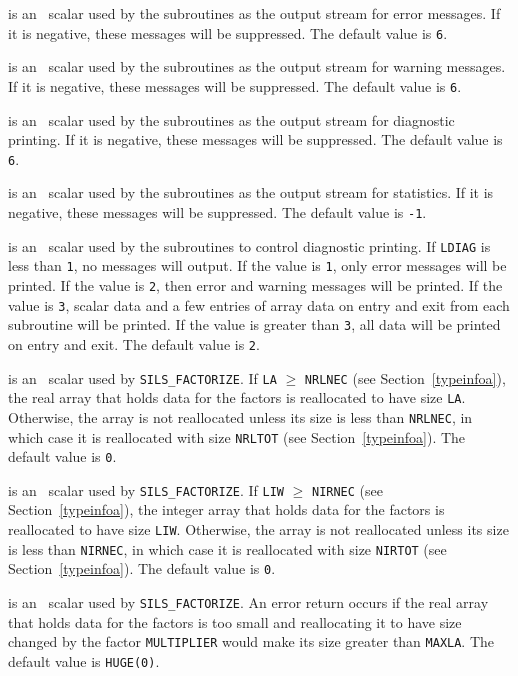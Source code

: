 \documentclass{galahad}
\newcommand{\packagename}{SILS}
\begin{document}
\begin{description}

 is an \integer\ scalar used by the subroutines as the output 
 stream for error messages.  If it is negative, these 
 messages will be suppressed.  The default value is {\tt 6}. 
 
 is an \integer\ scalar used by the subroutines as the output 
 stream for warning messages.  If it is negative, these messages  
 will be suppressed.  The default value is {\tt 6}. 
 
 is an \integer\ scalar used by the subroutines as the output 
 stream for diagnostic printing.  If it is negative, these messages  
 will be suppressed.  The default value is {\tt 6}. 
 
 is an \integer\ scalar used by the subroutines as the output 
 stream for statistics. If it is negative, these messages will  
 be suppressed.  The default value is {\tt -1}. 
 
 is an \integer\ scalar used by the subroutines to control 
 diagnostic printing.  If {\tt LDIAG} is less than {\tt 1}, no messages will 
 output. If the value is {\tt 1}, only error messages will 
 be printed.  If the value is {\tt 2}, then error and warning messages will 
 be printed. If the value is {\tt 3}, scalar data and a few 
 entries of array data on entry and exit from each subroutine will be 
 printed.  If the value is greater than {\tt 3}, all data will be printed on  
 entry and 
 exit.  The default value is {\tt 2}. 
 
 is an \integer\ scalar used by {\tt \packagename\_FACTORIZE}. 
If {\tt LA} $\geq$ 
{\tt NRLNEC} (see Section~\ref{typeinfoa}), the real array that holds data for the 
factors is reallocated to have size {\tt LA}.  Otherwise, the array is not 
reallocated unless its size is less than {\tt NRLNEC}, in which case it is 
reallocated with size {\tt NRLTOT} (see Section~\ref{typeinfoa}). The default value 
is {\tt 0}. 
 
 is an \integer\ scalar used by {\tt \packagename\_FACTORIZE}. If 
{\tt LIW} $\geq$ 
{\tt NIRNEC} (see Section~\ref{typeinfoa}), the integer 
array that holds data for the 
factors is reallocated to have size {\tt LIW}.  Otherwise, the array is not 
reallocated unless its size is less than {\tt NIRNEC}, in which case it is 
reallocated with size {\tt NIRTOT} (see Section~\ref{typeinfoa}). 
The default value 
is {\tt 0}. 
 
 is an \integer\ scalar used by {\tt \packagename\_FACTORIZE}. 
An error 
return occurs if the real array that holds data for the factors is too 
small and reallocating it to have size changed by the factor {\tt MULTIPLIER} 
would make its size greater than {\tt MAXLA}. The default value is 
{\tt HUGE(0)}. 
 

\end{description}
\end{document}

